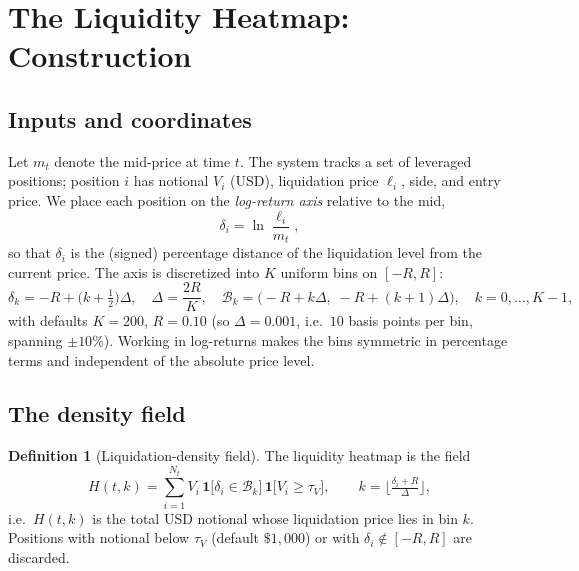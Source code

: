 \documentclass[11pt,a4paper]{article}
\theoremstyle{definition}
\newtheorem{definition}{Definition}[section]
\theoremstyle{plain}
\newcommand{\ind}{\mathbf{1}}
\begin{document}
\section{The Liquidity Heatmap: Construction}
\label{sec:heatmap}

\subsection{Inputs and coordinates}

Let $m_t$ denote the mid-price at time $t$. The system tracks a set of leveraged positions; position
$i$ has notional $V_i$ (USD), liquidation price $\ell_i$, side, and entry price. We place each
position on the \emph{log-return axis} relative to the mid,
\begin{equation}
  \delta_i = \ln\!\frac{\ell_i}{m_t},
  \label{eq:logreturn}
\end{equation}
so that $\delta_i$ is the (signed) percentage distance of the liquidation level from the current
price. The axis is discretized into $K$ uniform bins on $[-R, R]$:
\begin{equation}
  \delta_k = -R + \big(k+\tfrac12\big)\Delta,\quad
  \Delta = \frac{2R}{K},\quad
  \mathcal{B}_k = \big(-R + k\Delta,\; -R + (k{+}1)\Delta\big),\quad k = 0,\dots,K-1,
  \label{eq:bins}
\end{equation}
with defaults $K = 200$, $R = 0.10$ (so $\Delta = 0.001$, i.e.\ $10$ basis points per bin,
spanning $\pm 10\%$). Working in log-returns makes the bins symmetric in percentage terms and
independent of the absolute price level.

\subsection{The density field}

\begin{definition}[Liquidation-density field]
\label{def:field}
The liquidity heatmap is the field
\begin{equation}
  H(t,k) = \sum_{i=1}^{N_t} V_i \,\ind\!\big[\delta_i \in \mathcal{B}_k\big]\,
           \ind\!\big[V_i \geq \tau_V\big],
  \qquad k = \Big\lfloor \tfrac{\delta_i + R}{\Delta} \Big\rfloor,
  \label{eq:field}
\end{equation}
i.e.\ $H(t,k)$ is the total USD notional whose liquidation price lies in bin $k$. Positions with
notional below $\tau_V$ (default $\$1{,}000$) or with $\delta_i \notin [-R,R]$ are discarded.
\end{definition}
\end{document}
